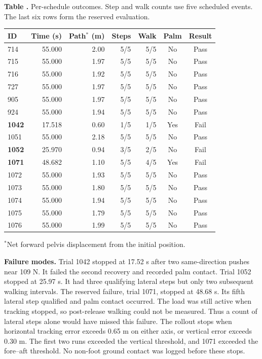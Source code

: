 \documentclass[10pt,letterpaper,twocolumn]{article}
\newcommand{\topic}[1]{\par\smallskip\noindent\textbf{#1.}\enspace}
\begin{document}
\begin{center}
\label{tab:trials}
{\fontsize{8.7}{10.5}\selectfont\textbf{Table \thetable.} Per-schedule outcomes. Step and walk counts use five scheduled events. The last six rows form the reserved evaluation.\par}
\vspace{3pt}
\fontsize{8.1}{10}\selectfont\setlength{\tabcolsep}{2.4pt}\renewcommand{}
\begin{tabular*}{\linewidth}{@{\extracolsep{\fill}}lrrrrcc@{}}\toprule
ID & Time (s) & Path$^*$ (m) & Steps & Walk & Palm & Result\\ \midrule
714 & 55.000 & 2.00 & 5/5 & 5/5 & No & Pass \\
715 & 55.000 & 1.97 & 5/5 & 5/5 & No & Pass \\
716 & 55.000 & 1.92 & 5/5 & 5/5 & No & Pass \\
727 & 55.000 & 1.97 & 5/5 & 5/5 & No & Pass \\
905 & 55.000 & 1.97 & 5/5 & 5/5 & No & Pass \\
924 & 55.000 & 1.94 & 5/5 & 5/5 & No & Pass \\
\textcolor{accent}{\bfseries 1042} & 17.518 & 0.60 & 1/5 & 1/5 & Yes & Fail \\
1051 & 55.000 & 2.18 & 5/5 & 5/5 & No & Pass \\
\textcolor{accent}{\bfseries 1052} & 25.970 & 0.94 & 3/5 & 2/5 & No & Fail \\
\textcolor{accent}{\bfseries 1071} & 48.682 & 1.10 & 5/5 & 4/5 & Yes & Fail \\
1072 & 55.000 & 1.93 & 5/5 & 5/5 & No & Pass \\
1073 & 55.000 & 1.80 & 5/5 & 5/5 & No & Pass \\
1074 & 55.000 & 1.94 & 5/5 & 5/5 & No & Pass \\
1075 & 55.000 & 1.79 & 5/5 & 5/5 & No & Pass \\
1076 & 55.000 & 1.99 & 5/5 & 5/5 & No & Pass \\
\bottomrule
\end{tabular*}
{\fontsize{8}{9}\selectfont $^*$Net forward pelvis displacement from the initial position.\par}
\end{center}
\topic{Failure modes}
Trial 1042 stopped at 17.52 s after two same-direction pushes near 109 N. It failed the second recovery and recorded palm contact. Trial 1052 stopped at 25.97 s. It had three qualifying lateral steps but only two subsequent walking intervals. The reserved failure, trial 1071, stopped at 48.68 s. Its fifth lateral step qualified and palm contact occurred. The load was still active when tracking stopped, so post-release walking could not be measured. Thus a count of lateral steps alone would have missed this failure. The rollout stops when horizontal tracking error exceeds 0.65 m on either axis, or vertical error exceeds 0.30 m. The first two runs exceeded the vertical threshold, and 1071 exceeded the fore--aft threshold. No non-foot ground contact was logged before these stops.
\end{document}
